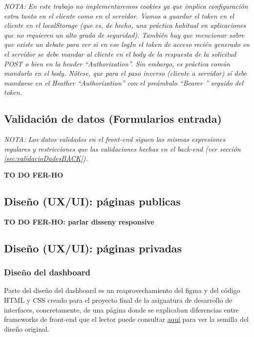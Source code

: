 \documentclass[a4paper,12pt]{report}
\begin{document}
	
	
\textit{NOTA: En este trabajo no implementaremos cookies ya que implica configuración extra tanto en el cliente como en el servidor. Vamos a guardar el token en el cliente en el localStorage (que es, de hecho, una práctica habitual en aplicaciones que no requieren un alto grado de seguridad). También hay que mencionar sobre que existe un debate para ver si en ese logIn el token de acceso recién generado en el servidor se debe mandar al cliente en el body de la respuesta de la solicitud POST \textit{o bien} en la header ``Authorization''. Sin embargo, es práctica común mandarlo en el body. Nótese, que para el paso inverso (cliente a servidor) sí debe mandarse en el Heather ``Authorization'' con el preámbulo ``Bearer '' seguido del token. }
	
	
	
	\subsection{Validación de datos (Formularios entrada)}
	\label{sec:validacioDadesFRONT}
	
	\textit{NOTA: Los datos validados en el front-end siguen las mismas expresiones regulares y restricciones que las validaciones hechas en el back-end (ver sección \ref{sec:validacioDadesBACK}).}
	
	\textbf{TO DO FER-HO}
	
	\subsection{Diseño (UX/UI): páginas publicas}
	\label{sec:disenyoPublicas}
	\textbf{TO DO FER-HO: parlar disseny responsive}
	
	\subsection{Diseño (UX/UI): páginas privadas}
	\label{sec:disenyoResponsivePrivadas}
	
	\subsubsection{Diseño del dashboard}
	
	Parte del diseño del dashboard es un reaprovechamiento del figma y del código HTML y CSS creado para el proyecto final de la asignatura de desarrollo de interfaces, concretamente, de una página donde se explicaban diferencias entre frameworks de front-end que el lector puede consultar  	\href{https://blackcub3s.github.io/proyectoDesarrolloInterfaces/FrontEnd.html}{aquí} para ver la semilla del diseño original.
	
\end{document}
